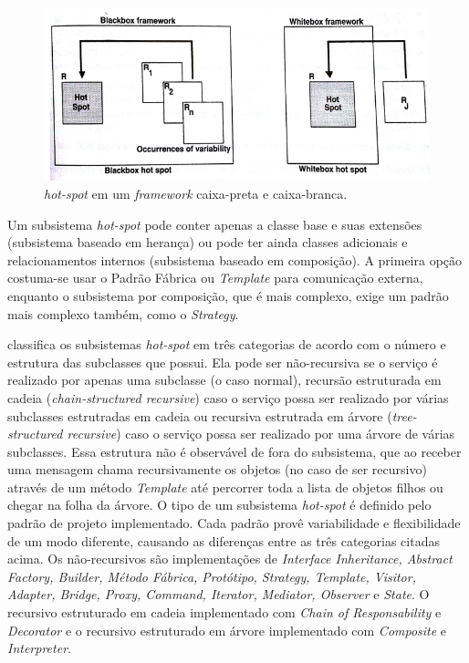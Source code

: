 \begin{figure}[h]
	\centering
	\label{fig13}
		\includegraphics[keepaspectratio=true,scale=0.3]{figuras/hotspotbox.jpg}
	\caption{\textit{hot-spot} em um \textit{framework} caixa-preta e caixa-branca. \cite{Fayad1999}}
\end{figure}

Um subsistema \textit{hot-spot} pode conter apenas a classe base e suas extensões (subsistema baseado em herança) ou pode ter ainda classes adicionais e relacionamentos internos (subsistema baseado em composição). A primeira opção costuma-se usar o Padrão Fábrica ou \textit{Template} para comunicação externa, enquanto o subsistema por composição, que é mais complexo, exige um padrão mais complexo também, como o \textit{Strategy}.

\cite{Fayad1999} classifica os subsistemas \textit{hot-spot} em três categorias de acordo com o número e estrutura das subclasses que possui. Ela pode ser não-recursiva se o serviço é realizado por apenas uma subclasse (o caso normal), recursão estruturada em cadeia (\textit{chain-structured recursive}) caso o serviço possa ser realizado por várias subclasses estrutradas em cadeia ou recursiva estrutrada em árvore (\textit{tree-structured recursive}) caso o serviço possa ser realizado por uma árvore de várias subclasses. Essa estrutura não é observável de fora do subsistema, que ao receber uma mensagem chama recursivamente os objetos (no caso de ser recursivo) através de um método \textit{Template} até percorrer toda a lista de objetos filhos ou chegar na folha da árvore. O tipo de um subsistema \textit{hot-spot} é definido pelo padrão de projeto implementado. Cada padrão provê variabilidade e flexibilidade de um modo diferente, causando as diferenças entre as três categorias citadas acima. Os não-recursivos são implementações de \textit{Interface Inheritance, Abstract Factory, Builder, Método Fábrica, Protótipo, Strategy, Template, Visitor, Adapter, Bridge, Proxy, Command, Iterator, Mediator, Observer} e \textit{State}. O recursivo estruturado em cadeia implementado com \textit{Chain of Responsability} e \textit{Decorator} e o recursivo estruturado em árvore implementado com \textit{Composite} e \textit{Interpreter}.

